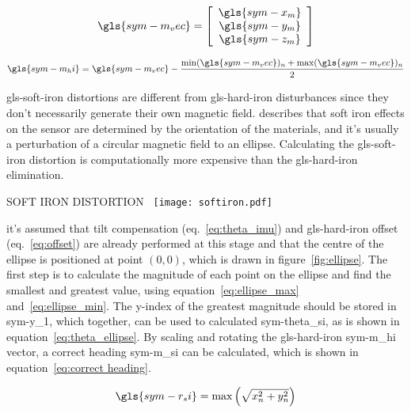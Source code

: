 \begin{equation}
    \gls{sym-m_vec} =
    \left[\begin{array}{c}
              \gls{sym-x_m} \\
              \gls{sym-y_m} \\
              \gls{sym-z_m}
    \end{array}\right]
\end{equation}

\begin{equation}
    \label{eq:offset}
    \gls{sym-m_hi} = \gls{sym-m_vec} - \frac{\min(\gls{sym-m_vec})_n + \max(\gls{sym-m_vec})_n}{2}
\end{equation}

\Gls{gls-soft-iron} distortions are different from \gls{gls-hard-iron} disturbances since they don't necessarily
generate their own magnetic field. \citet{leccadito_kalman_2013} describes that soft iron effects on the sensor are
determined by the orientation of the materials, and it's usually a perturbation of a circular magnetic field to an
ellipse. Calculating the \gls{gls-soft-iron} distortion is computationally more expensive than the \gls{gls-hard-iron}
elimination.

\begin{RoyalFigure}[!htb, label=fig:ellipse]{SOFT IRON DISTORTION~\cite{konvalin_technical_2008}}
    \texttt{[image: softiron.pdf]}
\end{RoyalFigure}

it's assumed that tilt compensation (eq.~\ref{eq:theta_imu}) and \gls{gls-hard-iron} offset (eq.~\ref{eq:offset}) are
already performed at this stage and that the centre of the ellipse is positioned at point \( (0,0) \), which is drawn
in figure~\ref{fig:ellipse}. The first step is to calculate the magnitude of each point on the ellipse and find the 
smallest and greatest value, using equation~\ref{eq:ellipse_max} and~\ref{eq:ellipse_min}. The y-index of the 
greatest magnitude should be stored in \gls{sym-y_1}, which together, can be used to calculated \gls{sym-theta_si}, 
as is shown in equation~\ref{eq:theta_ellipse}. By scaling and rotating the \gls{gls-hard-iron} \gls{sym-m_hi} 
vector, a correct heading \gls{sym-m_si} can be calculated, which is shown in equation~\ref{eq:correct heading}.

\begin{equation}
    \label{eq:ellipse_max}
    \gls{sym-r_si} = \max \left(\sqrt{x_n^2 + y_n^2}\right)
\end{equation}

